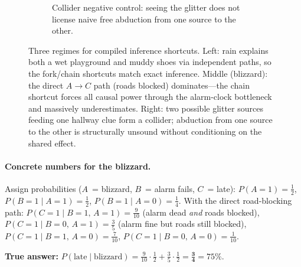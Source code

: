 \documentclass[11pt,openany]{report}
\begin{document}
\begin{figure}[H]
\medskip
\begin{subfigure}[t]{0.68\textwidth}
\centering
{}
\caption{Collider negative control: seeing the glitter does not license naive free abduction from one source to the other.}
\end{subfigure}
\caption{Three regimes for compiled inference shortcuts.  Left: rain explains both a wet playground and muddy shoes via independent paths, so the fork/chain shortcuts match exact inference.  Middle (blizzard): the direct $A \to C$ path (roads blocked) dominates---the chain shortcut forces all causal power through the alarm-clock bottleneck and massively underestimates.  Right: two possible glitter sources feeding one hallway clue form a collider; abduction from one source to the other is structurally unsound without conditioning on the shared effect.}
\label{fig:proof-carrying-contraction-school}
\end{figure}

\paragraph{Concrete numbers for the blizzard.}
Assign probabilities ($A$~= blizzard, $B$~= alarm fails, $C$~= late):
$P(A\!=\!1) = \tfrac12$,\;
$P(B\!=\!1 \mid A\!=\!1) = \tfrac12$,\;
$P(B\!=\!1 \mid A\!=\!0) = \tfrac14$.
With the direct road-blocking path:
$P(C\!=\!1 \mid B\!=\!1,\, A\!=\!1) = \tfrac{9}{10}$
(alarm dead \emph{and} roads blocked),\;
$P(C\!=\!1 \mid B\!=\!0,\, A\!=\!1) = \tfrac{3}{5}$
(alarm fine but roads still blocked),\;
$P(C\!=\!1 \mid B\!=\!1,\, A\!=\!0) = \tfrac{7}{10}$,\;
$P(C\!=\!1 \mid B\!=\!0,\, A\!=\!0) = \tfrac{1}{10}$.

\smallskip\noindent
\textbf{True answer:}
$P(\text{late} \mid \text{blizzard})
= \tfrac{9}{10}\!\cdot\!\tfrac12 + \tfrac35\!\cdot\!\tfrac12
= \mathbf{\tfrac34} = 75\%$.
\end{document}
